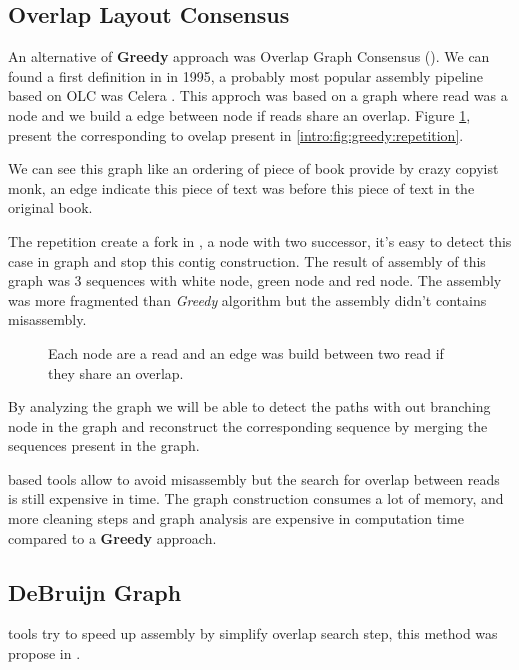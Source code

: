 \documentclass[./main.tex]{subfiles}
\begin{document}
\subsection{Overlap Layout Consensus} \label{intro:subsec:OLC}

An alternative of \textbf{Greedy} approach was Overlap Graph Consensus (\OLC). We can found a first \OLC definition in \cite{OLC_myers} in 1995, a probably most popular assembly pipeline based on OLC was Celera \cite{celera_first, celera_second}. This approch was based on a graph where read was a node and we build a edge between node if reads share an overlap. Figure \ref{intro:fig:olc:graph}, present the \OLC corresponding to ovelap present in \ref{intro:fig:greedy:repetition}.

We can see this graph like an ordering of piece of book provide by crazy copyist monk, an edge indicate this piece of text was before this piece of text in the original book.

The repetition create a fork in \OLC, a node with two successor, it's easy to detect this case in graph and stop this contig construction. The result of assembly of this graph was 3 sequences with white node, green node and red node. The assembly was more fragmented than \textit{Greedy} algorithm but the assembly didn't contains misassembly.

\begin{figure}[ht]
    \centering 
    
    \caption{Each node are a read and an edge was build between two read if they share an overlap.}
    \label{intro:fig:olc:graph}
\end{figure}

By analyzing the graph we will be able to detect the paths with out branching node in the graph and reconstruct the corresponding sequence by merging the sequences present in the graph.

\OLC based tools allow to avoid misassembly but the search for overlap between reads is still expensive in time. The graph construction consumes a lot of memory, and more cleaning steps and graph analysis are expensive in computation time compared to a \textbf{Greedy} approach. 

\subsection{DeBruijn Graph}

\DBG tools try to speed up assembly by simplify overlap search step, this method was propose in  \cite{eulerian_approach}.
\end{document}
